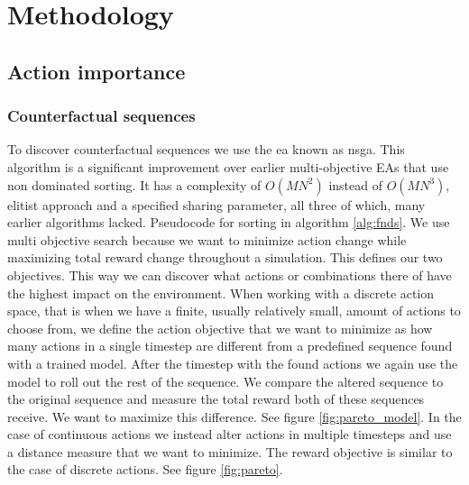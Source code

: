 \documentclass[UKenglish]{uiomasterthesis}
\begin{document}
\chapter{Methodology}

\section{Action importance}
\subsection{Counterfactual sequences}
\label{sec:counterfactual}
To discover counterfactual sequences we use the \ac{ea} known as \ac{nsga}. This algorithm is a significant improvement over earlier multi-objective EAs that use non dominated sorting. It has a complexity of $O(MN^2)$ instead of $O(MN^3)$, elitist approach and a specified sharing parameter, all three of which, many earlier algorithms lacked. \cite{Deb2001AFA} Pseudocode for sorting in algorithm \ref{alg:fnds}. 
We use multi objective search because we want to minimize action change while maximizing total reward change throughout a simulation. This defines our two objectives. This way we can discover what actions or combinations there of have the highest impact on the environment. When working with a discrete action space, that is when we have a finite, usually relatively small, amount of actions to choose from, we define the action objective that we want to minimize as how many actions in a single timestep are different from a predefined sequence found with a trained model. After the timestep with the found actions we again use the model to roll out the rest of the sequence. We compare the altered sequence to the original sequence and measure the total reward both of these sequences receive. We want to maximize this difference. See figure \ref{fig:pareto_model}. 
In the case of continuous actions we instead alter actions in multiple timesteps and use a distance measure that we want to minimize. The reward objective is similar to the case of discrete actions. See figure \ref{fig:pareto}.
\end{document}
